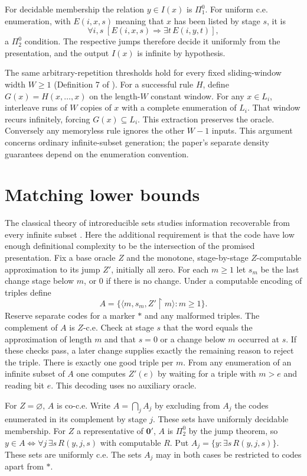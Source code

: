 \documentclass[11pt]{article}
\begin{document}
For decidable membership the relation $y\in I(x)$ is $\Pi^0_1$. For uniform c.e. enumeration, with $E(i,x,s)$ meaning that $x$ has been listed by stage $s$, it is
\[
 \forall i,s\;[E(i,x,s)\Longrightarrow\exists t\,E(i,y,t)],
\]
a $\Pi^0_2$ condition. The respective jumps therefore decide it uniformly from the presentation, and the output $I(x)$ is infinite by hypothesis.

The same arbitrary-repetition thresholds hold for every fixed sliding-window width $W\ge1$ (Definition 7 of \cite{kmsv}). For a successful rule $H$, define $G(x)=H(x,\ldots,x)$ on the length-$W$ constant window. For any $x\in L_i$, interleave runs of $W$ copies of $x$ with a complete enumeration of $L_i$. That window recurs infinitely, forcing $G(x)\subseteq L_i$. This extraction preserves the oracle. Conversely any memoryless rule ignores the other $W-1$ inputs. This argument concerns ordinary infinite-subset generation; the paper's separate density guarantees depend on the enumeration convention.

\section{Matching lower bounds}
The classical theory of introreducible sets studies information recoverable from every infinite subset \cite{jockusch}. Here the additional requirement is that the code have low enough definitional complexity to be the intersection of the promised presentation. Fix a base oracle $Z$ and the monotone, stage-by-stage $Z$-computable approximation to its jump $Z'$, initially all zero. For each $m\ge1$ let $s_m$ be the last change stage below $m$, or $0$ if there is no change. Under a computable encoding of triples define
\[
 A=\{\langle m,s_m,Z'{\upharpoonright}m\rangle:m\ge1\}.
\]
Reserve separate codes for a marker $*$ and any malformed triples. The complement of $A$ is $Z$-c.e. Check at stage $s$ that the word equals the approximation of length $m$ and that $s=0$ or a change below $m$ occurred at $s$. If these checks pass, a later change supplies exactly the remaining reason to reject the triple. There is exactly one good triple per $m$. From any enumeration of an infinite subset of $A$ one computes $Z'(e)$ by waiting for a triple with $m>e$ and reading bit $e$. This decoding uses no auxiliary oracle.

For $Z=\varnothing$, $A$ is co-c.e. Write $A=\bigcap_j A_j$ by excluding from $A_j$ the codes enumerated in its complement by stage $j$. These sets have uniformly decidable membership. For $Z$ a representative of $\mathbf 0'$, $A$ is $\Pi^0_2$ by the jump theorem, so $y\in A\iff\forall j\,\exists s\,R(y,j,s)$ with computable $R$. Put $A_j=\{y:\exists s\,R(y,j,s)\}$. These sets are uniformly c.e. The sets $A_j$ may in both cases be restricted to codes apart from $*$.
\end{document}
